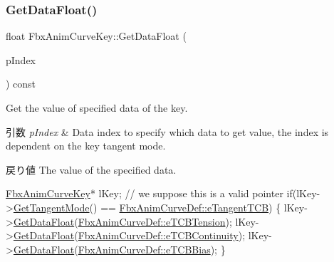 \subsubsection{\texorpdfstring{Get\+Data\+Float()}{GetDataFloat()}}
{\footnotesize\ttfamily float Fbx\+Anim\+Curve\+Key\+::\+Get\+Data\+Float (\begin{DoxyParamCaption}\item[{\hyperlink{class_fbx_anim_curve_def_a3be261d961f8226235529b148cf80300}{Fbx\+Anim\+Curve\+Def\+::\+E\+Data\+Index}}]{p\+Index }\end{DoxyParamCaption}) const}

Get the value of specified data of the key. 
\begin{DoxyParams}{引数}
{\em p\+Index} & Data index to specify which data to get value, the index is dependent on the key tangent mode. \\
\hline
\end{DoxyParams}
\begin{DoxyReturn}{戻り値}
The value of the specified data.
\end{DoxyReturn}

\begin{DoxyCode}
\hyperlink{class_fbx_anim_curve_key}{FbxAnimCurveKey}* lKey; \textcolor{comment}{// we suppose this is a valid pointer}
\textcolor{keywordflow}{if}(lKey->\hyperlink{class_fbx_anim_curve_key_a3821c01c7e1b422efcf2fedd074ffb6a}{GetTangentMode}() == \hyperlink{class_fbx_anim_curve_def_ac810ccc5ca0527704ab5175479964b87ae9d885e8a384fd9165123ac47a661dd8}{FbxAnimCurveDef::eTangentTCB})
\{
    lKey->\hyperlink{class_fbx_anim_curve_key_a3185c35241a072105f14327afd275452}{GetDataFloat}(\hyperlink{class_fbx_anim_curve_def_a3be261d961f8226235529b148cf80300a38129a423990a42f94187b77ab041caa}{FbxAnimCurveDef::eTCBTension});
    lKey->\hyperlink{class_fbx_anim_curve_key_a3185c35241a072105f14327afd275452}{GetDataFloat}(\hyperlink{class_fbx_anim_curve_def_a3be261d961f8226235529b148cf80300a5544ce65720f37d5a2620dc32556b2ba}{FbxAnimCurveDef::eTCBContinuity});
    lKey->\hyperlink{class_fbx_anim_curve_key_a3185c35241a072105f14327afd275452}{GetDataFloat}(\hyperlink{class_fbx_anim_curve_def_a3be261d961f8226235529b148cf80300a4ed5dbb6b725478205a3c750c20790d3}{FbxAnimCurveDef::eTCBBias});
\}
\end{DoxyCode}
 \mbox{\label{class_fbx_anim_curve_key_a21427b9606e3bb19b87f1bda1197a5eb}} 
